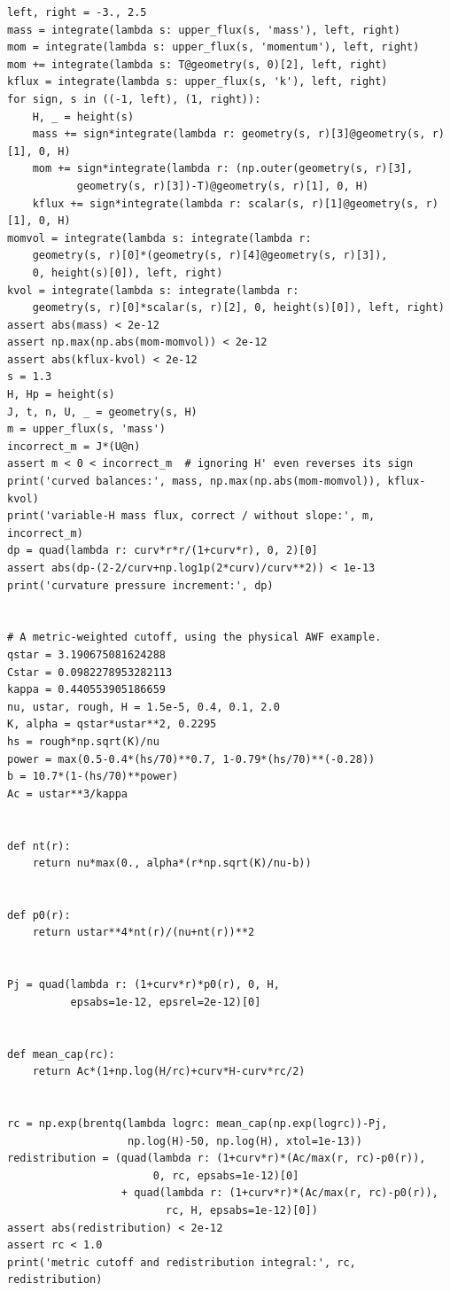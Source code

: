 \documentclass[11pt,a4paper]{article}
\numberwithin{equation}{section}
\begin{document}
\begin{lstlisting}[style=py]
left, right = -3., 2.5
mass = integrate(lambda s: upper_flux(s, 'mass'), left, right)
mom = integrate(lambda s: upper_flux(s, 'momentum'), left, right)
mom += integrate(lambda s: T@geometry(s, 0)[2], left, right)
kflux = integrate(lambda s: upper_flux(s, 'k'), left, right)
for sign, s in ((-1, left), (1, right)):
    H, _ = height(s)
    mass += sign*integrate(lambda r: geometry(s, r)[3]@geometry(s, r)[1], 0, H)
    mom += sign*integrate(lambda r: (np.outer(geometry(s, r)[3],
           geometry(s, r)[3])-T)@geometry(s, r)[1], 0, H)
    kflux += sign*integrate(lambda r: scalar(s, r)[1]@geometry(s, r)[1], 0, H)
momvol = integrate(lambda s: integrate(lambda r:
    geometry(s, r)[0]*(geometry(s, r)[4]@geometry(s, r)[3]),
    0, height(s)[0]), left, right)
kvol = integrate(lambda s: integrate(lambda r:
    geometry(s, r)[0]*scalar(s, r)[2], 0, height(s)[0]), left, right)
assert abs(mass) < 2e-12
assert np.max(np.abs(mom-momvol)) < 2e-12
assert abs(kflux-kvol) < 2e-12
s = 1.3
H, Hp = height(s)
J, t, n, U, _ = geometry(s, H)
m = upper_flux(s, 'mass')
incorrect_m = J*(U@n)
assert m < 0 < incorrect_m  # ignoring H' even reverses its sign
print('curved balances:', mass, np.max(np.abs(mom-momvol)), kflux-kvol)
print('variable-H mass flux, correct / without slope:', m, incorrect_m)
dp = quad(lambda r: curv*r*r/(1+curv*r), 0, 2)[0]
assert abs(dp-(2-2/curv+np.log1p(2*curv)/curv**2)) < 1e-13
print('curvature pressure increment:', dp)


# A metric-weighted cutoff, using the physical AWF example.
qstar = 3.190675081624288
Cstar = 0.0982278953282113
kappa = 0.440553905186659
nu, ustar, rough, H = 1.5e-5, 0.4, 0.1, 2.0
K, alpha = qstar*ustar**2, 0.2295
hs = rough*np.sqrt(K)/nu
power = max(0.5-0.4*(hs/70)**0.7, 1-0.79*(hs/70)**(-0.28))
b = 10.7*(1-(hs/70)**power)
Ac = ustar**3/kappa


def nt(r):
    return nu*max(0., alpha*(r*np.sqrt(K)/nu-b))


def p0(r):
    return ustar**4*nt(r)/(nu+nt(r))**2


Pj = quad(lambda r: (1+curv*r)*p0(r), 0, H,
          epsabs=1e-12, epsrel=2e-12)[0]


def mean_cap(rc):
    return Ac*(1+np.log(H/rc)+curv*H-curv*rc/2)


rc = np.exp(brentq(lambda logrc: mean_cap(np.exp(logrc))-Pj,
                   np.log(H)-50, np.log(H), xtol=1e-13))
redistribution = (quad(lambda r: (1+curv*r)*(Ac/max(r, rc)-p0(r)),
                       0, rc, epsabs=1e-12)[0]
                  + quad(lambda r: (1+curv*r)*(Ac/max(r, rc)-p0(r)),
                         rc, H, epsabs=1e-12)[0])
assert abs(redistribution) < 2e-12
assert rc < 1.0
print('metric cutoff and redistribution integral:', rc, redistribution)



\end{lstlisting}
\end{document}

